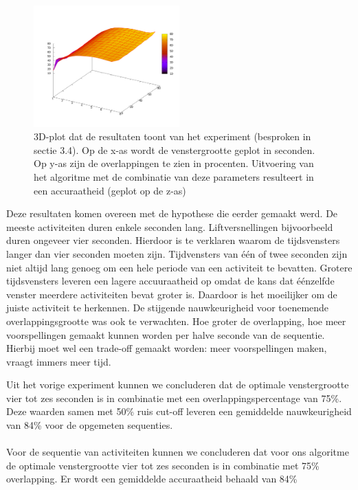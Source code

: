 \documentclass{article}
\begin{document}
\begin{figure}[h]
\centering
\includegraphics[width=0.5\textwidth]{figures/3dplot}
\caption{3D-plot dat de resultaten toont van het experiment (besproken in sectie 3.4). Op de x-as wordt de venstergrootte geplot in seconden. Op y-as zijn de overlappingen te zien in procenten. Uitvoering van het algoritme met de combinatie van deze parameters resulteert in een accuraatheid (geplot op de z-as)}
\label{fig:3d}
\end{figure}

Deze resultaten komen overeen met de hypothese die eerder gemaakt werd. De meeste activiteiten duren enkele seconden lang. Liftversnellingen bijvoorbeeld duren ongeveer vier seconden. Hierdoor is te verklaren waarom de tijdsvensters langer dan vier seconden moeten zijn. Tijdvensters van \'e\'en of twee seconden zijn niet altijd lang genoeg om een hele periode van een activiteit te bevatten. Grotere tijdsvensters leveren een lagere accuuraatheid op omdat de kans dat \'e\'enzelfde venster meerdere activiteiten bevat groter is. Daardoor is het moeilijker om de juiste activiteit te herkennen. De stijgende nauwkeurigheid voor toenemende overlappingsgrootte was ook te verwachten. Hoe groter de overlapping, hoe meer voorspellingen gemaakt kunnen worden per halve seconde van de sequentie. Hierbij moet wel een trade-off gemaakt worden: meer voorspellingen maken, vraagt immers meer tijd.

Uit het vorige experiment kunnen we concluderen dat de optimale venstergrootte vier tot zes seconden is in combinatie met een overlappingspercentage van 75\%. Deze waarden samen met 50\% ruis cut-off leveren een gemiddelde nauwkeurigheid van 84\% voor de opgemeten sequenties.
\\~\\

Voor de sequentie van activiteiten kunnen we concluderen dat voor ons algoritme de optimale venstergrootte vier tot zes seconden is in combinatie met 75\% overlapping. Er wordt een gemiddelde accuraatheid behaald van 84\%
\end{document}

